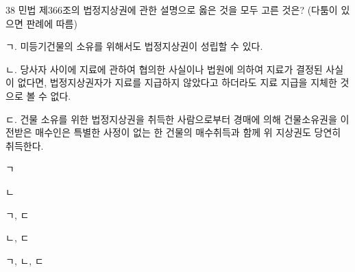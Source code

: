\begin{question}{38}
민법 제366조의 법정지상권에 관한 설명으로 옳은 것을 모두 고른 것은? (다툼이 있으면 판례에 따름)
\begin{framedtext}
ㄱ. 미등기건물의 소유를 위해서도 법정지상권이 성립할 수 있다. \par
ㄴ. 당사자 사이에 지료에 관하여 협의한 사실이나 법원에 의하여 지료가 결정된 사실이 없다면, 법정지상권자가 지료를 지급하지 않았다고 하더라도 지료 지급을 지체한 것으로 볼 수 없다. \par
ㄷ. 건물 소유를 위한 법정지상권을 취득한 사람으로부터 경매에 의해 건물소유권을 이전받은 매수인은 특별한 사정이 없는 한 건물의 매수취득과 함께 위 지상권도 당연히 취득한다.
\end{framedtext}
\begin{choices}
  \item ㄱ
  \item ㄴ
  \item ㄱ, ㄷ
  \item ㄴ, ㄷ
  \item ㄱ, ㄴ, ㄷ
\end{choices}
\end{question}
